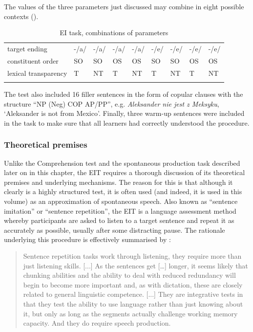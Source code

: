 The values of the three parameters just discussed may combine in eight possible contexts ().

\begin{table}
    \begin{tabularx}{\textwidth}{Xllllllll}
    \lsptoprule
        target ending & {}-/a/ & {}-/a/ & {}-/a/ & {}-/a/ & {}-/e/ & {}-/e/ & {}-/e/ & {}-/e/\\
        constituent order & SO & SO & OS & OS & SO & SO & OS & OS\\
        lexical transparency & T & NT & T & NT & T & NT & T & NT\\
    \lspbottomrule
    \end{tabularx}
    \caption{EI task, combinations of parameters}
    \label{tab:02:13}
\end{table}

The test also included 16 filler sentences in the form of copular clauses with the structure “NP (Neg) COP AP/PP”, e.g. \textit{Aleksander nie jest z Meksyku}, ‘Aleksander is not from Mexico’. Finally, three warm-up sentences were included in the task to make sure that all learners had correctly understood the procedure.

\subsubsection{Theoretical premises}

Unlike the Comprehension test and the spontaneous production task described later on in this chapter, the EIT requires a thorough discussion of its theoretical premises and underlying mechanisms. The reason for this is that although it clearly is a highly structured test, it is often used (and indeed, it is used in this volume) as an approximation of spontaneous speech. Also known as “sentence imitation” or “sentence repetition”, the EIT is a language assessment method whereby participants are asked to listen to a target sentence and repeat it as accurately as possible, usually after some distracting pause. The rationale underlying this procedure is effectively summarised by \citet[79]{Buck2001}:

\begin{quote} Sentence repetition tasks work through listening, they require more than just listening skills. [...] As the sentences get […] longer, it seems likely that chunking abilities and the ability to deal with reduced redundancy will begin to become more important and, as with dictation, these are closely related to general linguistic competence. [...] They are integrative tests in that they test the ability to use language rather than just knowing about it, but only as long as the segments actually challenge working memory capacity. And they do require speech production.\end{quote}

